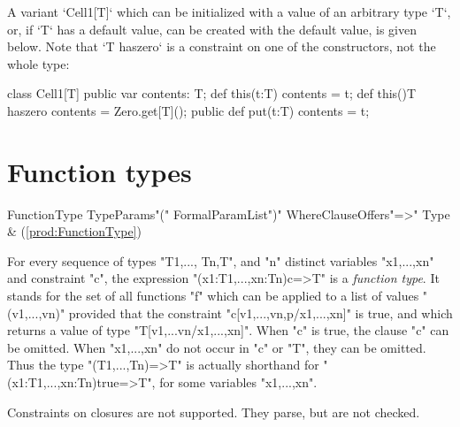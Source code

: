 \begin{ex}
A variant \xcd`Cell1[T]` which can be initialized with a value of an arbitrary
type
\xcd`T`, or, if \xcd`T` has a default value, can be created with the default
value, is given below.  Note that \xcd`T haszero` is a constraint on one of
the constructors, not the whole type:  
\begin{xten}
class Cell1[T] {
  public var contents: T;
  def this(t:T) { contents = t; }
  def this(){T haszero} { contents = Zero.get[T](); }
  public def put(t:T) {contents = t;}
}
\end{xten}
%

\end{ex}

\section{Function types}
\label{FunctionTypes}
\label{FunctionType}

\begin{bbgrammar}
        FunctionType \: TypeParams\opt \xcd"(" FormalParamList\opt \xcd")" WhereClause\opt Offers\opt \xcd"=>" Type & (\ref{prod:FunctionType}) \\
\end{bbgrammar}


For every sequence of types \xcd"T1,..., Tn,T", and \xcd"n" distinct variables
\xcd"x1,...,xn" and constraint \xcd"c", the expression
\xcd"(x1:T1,...,xn:Tn){c}=>T" is a \emph{function type}. It stands for
 the set of all functions \xcd"f" which can be applied to a
 list of values \xcd"(v1,...,vn)" provided that the constraint
 \xcd"c[v1,...,vn,p/x1,...,xn]" is true, and which returns a value of
 type \xcd"T[v1,...vn/x1,...,xn]". When \xcd"c" is true, the clause \xcd"{c}" can be
 omitted. When \xcd"x1,...,xn" do not occur in \xcd"c" or \xcd"T", they can be
 omitted. Thus the type \xcd"(T1,...,Tn)=>T" is actually shorthand for
 \xcd"(x1:T1,...,xn:Tn){true}=>T", for some variables \xcd"x1,...,xn".

\limitationx{}
Constraints on closures are not supported.  They parse, but are not checked.

